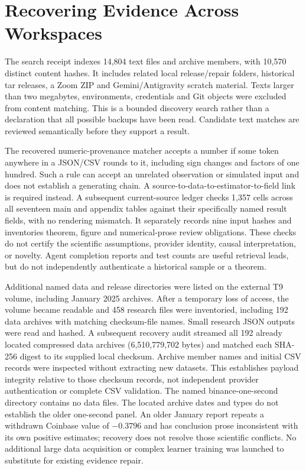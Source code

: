 \section{Recovering Evidence Across Workspaces}
The search receipt indexes 14,804 text files and archive members, with 10,570 distinct content hashes. It includes related local release/repair folders, historical tar releases, a Zoom ZIP and Gemini/Antigravity scratch material. Texts larger than two megabytes, environments, credentials and Git objects were excluded from content matching. This is a bounded discovery search rather than a declaration that all possible backups have been read. Candidate text matches are reviewed semantically before they support a result.

The recovered numeric-provenance matcher accepts a number if some token anywhere in a JSON/CSV rounds to it, including sign changes and factors of one hundred. Such a rule can accept an unrelated observation or simulated input and does not establish a generating chain. A source-to-data-to-estimator-to-field link is required instead. A subsequent current-source ledger checks 1,357 cells across all seventeen main and appendix tables against their specifically named result fields, with no rendering mismatch. It separately records nine input hashes and inventories theorem, figure and numerical-prose review obligations. These checks do not certify the scientific assumptions, provider identity, causal interpretation, or novelty. Agent completion reports and test counts are useful retrieval leads, but do not independently authenticate a historical sample or a theorem.

Additional named data and release directories were listed on the external T9 volume, including January 2025 archives. After a temporary loss of access, the volume became readable and 458 research files were inventoried, including 192 data archives with matching checksum-file names. Small research JSON outputs were read and hashed. A subsequent recovery audit streamed all 192 already located compressed data archives (6,510,779,702 bytes) and matched each SHA-256 digest to its supplied local checksum. Archive member names and initial CSV records were inspected without extracting new datasets. This establishes payload integrity relative to those checksum records, not independent provider authentication or complete CSV validation. The named binance-one-second directory contains no data files. The located archive dates and types do not establish the older one-second panel. An older January report repeats a withdrawn Coinbase value of $-0.3796$ and has conclusion prose inconsistent with its own positive estimates; recovery does not resolve those scientific conflicts. No additional large data acquisition or complex learner training was launched to substitute for existing evidence repair.


